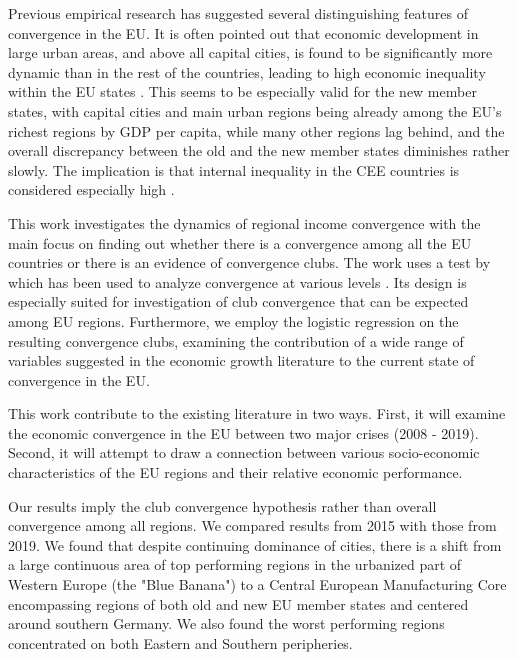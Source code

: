 \documentclass[11pt]{article}
\begin{document}
Previous empirical research has suggested several distinguishing features of convergence in the EU. It is often pointed out that economic development in large urban areas, and above all capital cities, is found to be significantly more dynamic than in the rest of the countries, leading to high economic inequality within the EU states \citep{geppert2008regional}. This seems to be especially valid for the new member states, with capital cities and main urban regions being already among the EU's richest regions by GDP per capita, while many other regions lag behind, and the overall discrepancy between the old and the new member states diminishes rather slowly. The implication is that internal inequality in the CEE countries is considered especially high \citep{geppert2008regional,sme2012regional, smketkowski2013regional}.


This work investigates the dynamics of regional income convergence with the main focus on finding out whether there is a convergence among all the EU countries or there is an evidence of convergence clubs. The work uses a test by \citet{phillips2007transition} which has been used to analyze convergence at various levels \citep{bartkowska2012regional, borsi2015evolution, von2017regional}. Its design is especially suited for investigation of club convergence that can be expected among EU regions. Furthermore, we employ the logistic regression on the resulting convergence clubs, examining the contribution of a wide range of variables suggested in the economic growth literature to the current state of convergence in the EU.

This work contribute to the existing literature in two ways. First, it will examine the economic convergence in the EU between two major crises (2008 - 2019). Second, it will attempt to draw a connection between various socio-economic characteristics of the EU regions and their relative economic performance.

Our results imply the club convergence hypothesis rather than overall convergence among all regions. We compared results from 2015 with those from 2019. We found that despite continuing dominance of cities, there is a shift from a large continuous area of top performing regions in the urbanized part of Western Europe (the "Blue Banana") to a Central European Manufacturing Core encompassing regions of both old and new EU member states and centered around southern Germany. We also found the worst performing regions concentrated on both Eastern and Southern peripheries.
\end{document}
